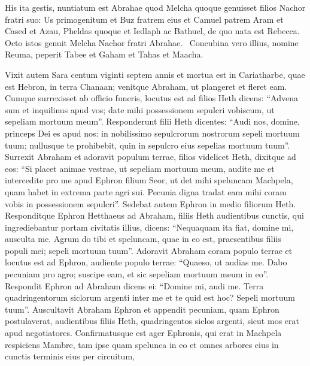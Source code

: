 \begin{biblechapter}
\begin{biblechapter}
\begin{biblechapter}
\begin{biblechapter}
\begin{biblechapter}
\begin{biblechapter}
\begin{biblechapter}
\begin{biblechapter}
\begin{biblechapter}
\begin{biblechapter}
\begin{biblechapter}
\begin{biblechapter}
\begin{biblechapter}
\begin{biblechapter}
\begin{biblechapter}
\begin{biblechapter}
\begin{biblechapter}
\begin{biblechapter}
\begin{biblechapter}
\begin{biblechapter}
\begin{biblechapter}
\begin{biblechapter}
 \verse His ita gestis, nuntiatum est Abrahae quod Melcha quoque genuisset filios Nachor fratri suo: 
\verse Us primogenitum et Buz fratrem eius et Camuel patrem Aram 
\verse et Cased et Azau, Pheldas quoque et Iedlaph 
\verse ac Bathuel, de quo nata est Rebecca. Octo istos genuit Melcha Nachor fratri Abrahae. 
 \verse Concubina vero illius, nomine Reuma, peperit Tabee et Gaham et Tahas et Maacha.
 
\begin{biblechapter}
\verse Vixit autem Sara centum viginti septem annis 
\verse et mortua est in Cariatharbe, quae est Hebron, in terra Chanaan; venitque Abraham, ut plangeret et fleret eam. 
\verse Cumque surrexisset ab officio funeris, locutus est ad filios Heth dicens: 
\verse “Advena sum et inquilinus apud vos; date mihi possessionem sepulcri vobiscum, ut sepeliam mortuum meum”. 
\verse Responderunt filii Heth dicentes: 
\verse “Audi nos, domine, princeps Dei es apud nos: in nobilissimo sepulcrorum nostrorum sepeli mortuum tuum; nullusque te prohibebit, quin in sepulcro eius sepelias mortuum tuum”.
 \verse Surrexit Abraham et adoravit populum terrae, filios videlicet Heth, 
\verse dixitque ad eos: “Si placet animae vestrae, ut sepeliam mortuum meum, audite me et intercedite pro me apud Ephron filium Seor, 
\verse ut det mihi speluncam Machpela, quam habet in extrema parte agri sui. Pecunia digna tradat eam mihi coram vobis in possessionem sepulcri”. 
\verse Sedebat autem Ephron in medio filiorum Heth. Responditque Ephron Hetthaeus ad Abraham, filiis Heth audientibus cunctis, qui ingrediebantur portam civitatis illius, dicens: 
\verse “Nequaquam ita fiat, domine mi, ausculta me. Agrum do tibi et speluncam, quae in eo est, praesentibus filiis populi mei; sepeli mortuum tuum”.
 \verse Adoravit Abraham coram populo terrae 
\verse et locutus est ad Ephron, audiente populo terrae: “Quaeso, ut audias me. Dabo pecuniam pro agro; suscipe eam, et sic sepeliam mortuum meum in eo”. 
\verse Respondit Ephron ad Abraham dicens ei: 
\verse “Domine mi, audi me. Terra quadringentorum siclorum argenti inter me et te quid est hoc? Sepeli mortuum tuum”.
 \verse Auscultavit Abraham Ephron et appendit pecuniam, quam Ephron postulaverat, audientibus filiis Heth, quadringentos siclos argenti, sicut mos erat apud negotiatores.
 \verse Confirmatusque est ager Ephronis, qui erat in Machpela respiciens Mambre, tam ipse quam spelunca in eo et omnes arbores eius in cunctis terminis eius per circuitum, 

\end{biblechapter}
\end{biblechapter}
\end{biblechapter}
\end{biblechapter}
\end{biblechapter}
\end{biblechapter}
\end{biblechapter}
\end{biblechapter}
\end{biblechapter}
\end{biblechapter}
\end{biblechapter}
\end{biblechapter}
\end{biblechapter}
\end{biblechapter}
\end{biblechapter}
\end{biblechapter}
\end{biblechapter}
\end{biblechapter}
\end{biblechapter}
\end{biblechapter}
\end{biblechapter}
\end{biblechapter}
\end{biblechapter}
